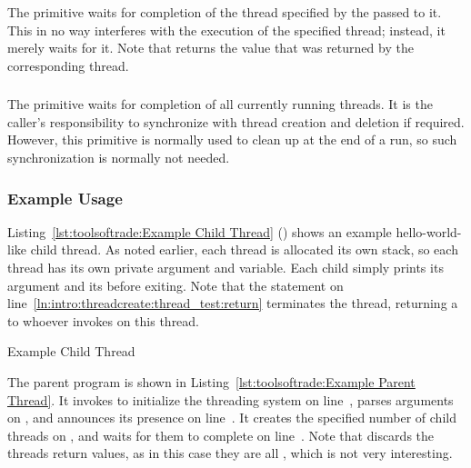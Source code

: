 The  primitive waits for completion of the thread
specified by the  passed to it.
This in no way interferes with the execution of the specified thread;
instead, it merely waits for it.
Note that  returns the value that was returned by
the corresponding thread.

\subsubsection{}

The 
primitive waits for completion of all currently running threads.
It is the caller's responsibility to synchronize with thread creation
and deletion if required.
However, this primitive is normally used to clean up at the end of
a run, so such synchronization is normally not needed.

\subsubsection{Example Usage}

Listing~\ref{lst:toolsoftrade:Example Child Thread} ()
shows an example hello-world-like child thread.
As noted earlier, each thread is allocated its own stack, so
each thread has its own private  argument and  variable.
Each child simply prints its argument and its 
before exiting.
Note that the  statement on
line~\ref{ln:intro:threadcreate:thread_test:return} terminates the thread,
returning a  to whoever invokes  on this
thread.

\begin{listing}[tbp]

\caption{Example Child Thread}
\label{lst:toolsoftrade:Example Child Thread}
\end{listing}

\begin{fcvref}
The parent program is shown in
Listing~\ref{lst:toolsoftrade:Example Parent Thread}.
It invokes  to initialize the threading system on
line~,
parses arguments on ,
and announces its presence on line~.
It creates the specified number of child threads on
,
and waits for them to complete on line~.
Note that  discards the threads return values,
as in this case they are all , which is not very interesting.
\end{fcvref}

